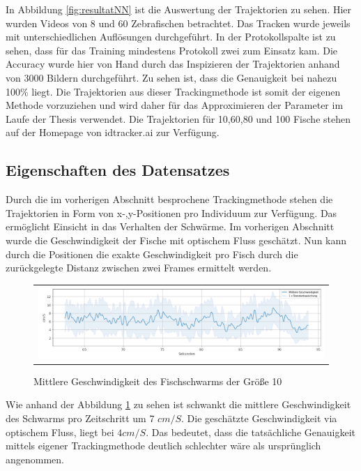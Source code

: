 In Abbildung \ref{fig:resultatNN} ist die Auswertung der Trajektorien zu sehen. Hier wurden Videos von 8 und 60 Zebrafischen betrachtet. Das Tracken wurde jeweils mit unterschiedlichen Auflösungen durchgeführt.
In der Protokollspalte ist zu sehen, dass für das Training mindestens Protokoll zwei zum Einsatz kam.
Die Accuracy wurde hier von Hand durch das Inspizieren der Trajektorien anhand von 3000 Bildern durchgeführt.
Zu sehen ist, dass die Genauigkeit bei nahezu 100\% liegt. Die Trajektorien aus dieser Trackingmethode ist somit der eigenen Methode vorzuziehen und wird daher für das Approximieren der Parameter im Laufe der Thesis verwendet.
Die Trajektorien für 10,60,80 und 100 Fische stehen auf der Homepage von idtracker.ai zur Verfügung.

\subsection{Eigenschaften des Datensatzes}\label{ab:EDD}

Durch die im vorherigen Abschnitt besprochene Trackingmethode stehen die Trajektorien in Form von x-,y-Positionen pro Individuum zur Verfügung. Das ermöglicht Einsicht in das Verhalten der Schwärme.
Im vorherigen Abschnitt wurde die Geschwindigkeit der Fische mit optischem Fluss geschätzt. Nun kann durch die Positionen die exakte Geschwindigkeit pro Fisch durch die zurückgelegte Distanz zwischen zwei Frames ermittelt werden.

\begin{figure}[H]
\centering
\begin{tabular}{l}
\includegraphics[width=1.0\textwidth]{figures/Experimente/Tracking/geschw_10F.png} 
\end{tabular}
\caption{ Mittlere Geschwindigkeit des Fischschwarms der Größe 10} \label{fig:geschw_10}
\end{figure}

Wie anhand der Abbildung \ref{fig:geschw_10} zu sehen ist schwankt die mittlere Geschwindigkeit des Schwarms pro Zeitschritt um 7 $cm/S$. Die geschätzte Geschwindigkeit via optischem Fluss, liegt bei $4 cm/S$. Das bedeutet, dass die tatsächliche Genauigkeit mittels eigener Trackingmethode deutlich schlechter wäre als ursprünglich angenommen.


